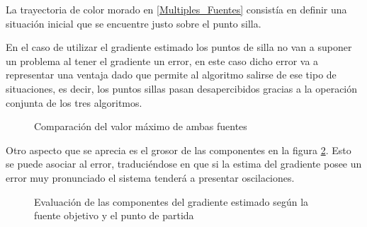 La trayectoria de color morado en \ref{Multiples_Fuentes} consistía en definir una situación inicial que se encuentre justo sobre el punto silla. 

En el caso de utilizar el gradiente estimado los puntos de silla no van a suponer un problema al tener el gradiente un error, en este caso dicho error va a representar una ventaja dado que permite al algoritmo salirse de ese tipo de situaciones, es decir, los puntos sillas pasan desapercibidos gracias a la operación conjunta de los tres algoritmos.

\begin{figure}[H]
  \begin{center}
    \caption{Comparación del valor máximo de ambas fuentes}
    \label{Fun_Gauss_Multi}
  \end{center}
\end{figure}
Otro aspecto que se aprecia es el grosor de las componentes en la figura \ref{Comp_Multi_Gaussian}. Esto se puede asociar al error, traduciéndose en que si la estima del gradiente posee un error muy pronunciado el sistema tenderá a presentar oscilaciones.

\begin{figure}[H]
  \begin{center}
    \caption{Evaluación de las componentes del gradiente estimado según la fuente objetivo y el punto de partida}
    \label{Comp_Multi_Gaussian}
  \end{center}
\end{figure}






